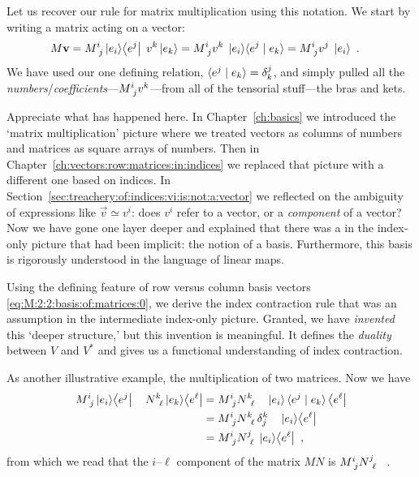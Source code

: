 \documentclass[12pt, oneside]{report}    %
\begin{document}
Let us recover our rule for matrix multiplication using this notation. We start by writing a matrix acting on a vector:
\begin{align}
    M\vec{v} &= 
    M\aij{i}{j}\ket{e_i}\!\bra{e^j}\; 
    v^k\ket{e_k}
    =
    M\aij{i}{j} 
    v^k\; 
    \ket{e_i}\!\la{e^j} \mid {e_k} \ra
    =
    M\aij{i}{j} 
    v^j\; \ket{e_i} \ .
\end{align}
We have used our one defining relation, $\langle{e^j} \mid {e_k} \rangle = \delta^j_k$, and simply pulled all the \emph{numbers}/\emph{coefficients}---$M\aij{i}{j} v^k$---from all of the tensorial stuff---the bras and kets. 

\begin{bigidea}
Appreciate what has happened here. In Chapter~\ref{ch:basics} we introduced the `matrix multiplication' picture where we treated vectors as columns of numbers and matrices as square arrays of numbers. Then in Chapter~\ref{ch:vectors:row:matrices:in:indices} we replaced that picture with a different one based on indices. In Section~\ref{sec:treachery:of:indices:vi:is:not:a:vector} we reflected on the ambiguity of expressions like $\vec{v}\simeq v^i$: does $v^i$ refer to a vector, or a \emph{component} of a vector? Now we have gone one layer deeper and explained that there was a in the index-only picture that had been implicit: the notion of a basis. Furthermore, this basis is rigorously understood in the language of linear maps. 

Using the defining feature of row versus column basis vectors \eqref{eq:M:2:2:basis:of:matrices:0}, we derive the index contraction rule that was an assumption in the intermediate index-only picture. Granted, we have \emph{invented} this `deeper structure,' but this invention is meaningful. It defines the \emph{duality} between $V$ and $V^*$ and gives us a functional understanding of index contraction.
\end{bigidea}

As another illustrative example, the multiplication of two matrices. Now we have
\begin{align}
    M\aij{i}{j} \ket{e_i}\! \bra{e^j} \quad N\aij{k}{\ell}  \ket{e_k}\!\bra{e^\ell}
    &=
    M\aij{i}{j} N\aij{k}{\ell} \quad \ket{e_i} \la{e^j} \mid {e_k}\ra \bra{e^\ell}
    \label{eq:basis:matrix:mult:MN}
    \\&=
    M\aij{i}{j} N\aij{k}{\ell}\, \delta^k_j \quad \ket{e_i}\!\bra{e^\ell} 
    \\&=
    M\aij{i}{j} N\aij{j}{\ell} \; \ket{e_i}\!\bra{e^\ell} \ ,
\end{align}
from which we read that the $i$--$\ell$ component of the matrix $MN$ is $ M\aij{i}{j} N\aij{j}{\ell}$ \ .
\end{document}
